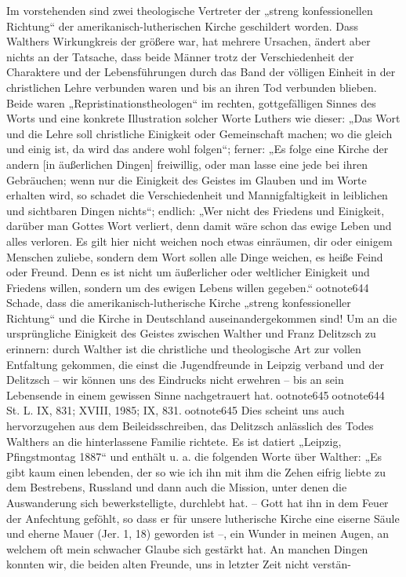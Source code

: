 Im vorstehenden sind zwei theologische Vertreter der „streng konfessionellen Richtung“ der amerikanisch-lutherischen Kirche geschildert worden. Dass Walthers Wirkungkreis der größere war, hat mehrere Ursachen, ändert aber nichts an der Tatsache, dass beide Männer trotz der Verschiedenheit der Charaktere und der Lebensführungen durch das Band der völligen Einheit in der christlichen Lehre verbunden waren und bis an ihren Tod verbunden blieben. Beide waren „Repristinationstheologen“ im rechten, gottgefälligen Sinnes des Worts und eine konkrete Illustration solcher Worte Luthers wie dieser: „Das Wort und die Lehre soll christliche Einigkeit oder Gemeinschaft machen; wo die gleich und einig ist, da wird das andere wohl folgen“; ferner: „Es folge eine Kirche der andern [in äußerlichen Dingen] freiwillig, oder man lasse eine jede bei ihren Gebräuchen; wenn nur die Einigkeit des Geistes im Glauben und im Worte erhalten wird, so schadet die Verschiedenheit und Mannigfaltigkeit in leiblichen und sichtbaren Dingen nichts“; endlich: „Wer nicht des Friedens und Einigkeit, darüber man Gottes Wort verliert, denn damit wäre schon das ewige Leben und alles verloren. Es gilt hier nicht weichen noch etwas einräumen, dir oder einigem Menschen zuliebe, sondern dem Wort sollen alle Dinge weichen, es heiße Feind oder Freund. Denn es ist nicht um äußerlicher oder weltlicher Einigkeit und Friedens willen, sondern um des ewigen Lebens willen gegeben.“ootnote{644} Schade, dass die amerikanisch-lutherische Kirche „streng konfessioneller Richtung“ und die Kirche in Deutschland auseinandergekommen sind! Um an die ursprüngliche Einigkeit des Geistes zwischen Walther und Franz Delitzsch zu erinnern: durch Walther ist die christliche und theologische Art zur vollen Entfaltung gekommen, die einst die Jugendfreunde in Leipzig verband und der Delitzsch – wir können uns des Eindrucks nicht erwehren – bis an sein Lebensende in einem gewissen Sinne nachgetrauert hat.ootnote{645}ootnote{644} St. L. IX, 831; XVIII, 1985; IX, 831.ootnote{645} Dies scheint uns auch hervorzugehen aus dem Beileidsschreiben, das Delitzsch anlässlich des Todes Walthers an die hinterlassene Familie richtete. Es ist datiert „Leipzig, Pfingstmontag 1887“ und enthält u. a. die folgenden Worte über Walther: „Es gibt kaum einen lebenden, der so wie ich ihn mit ihm die Zehen eifrig liebte zu dem Bestrebens, Russland und dann auch die Mission, unter denen die Auswanderung sich bewerkstelligte, durchlebt hat. – Gott hat ihn in dem Feuer der Anfechtung geföhlt, so dass er für unsere lutherische Kirche eine eiserne Säule und eherne Mauer (Jer. 1, 18) geworden ist –, ein Wunder in meinen Augen, an welchem oft mein schwacher Glaube sich gestärkt hat. An manchen Dingen konnten wir, die beiden alten Freunde, uns in letzter Zeit nicht verstän-